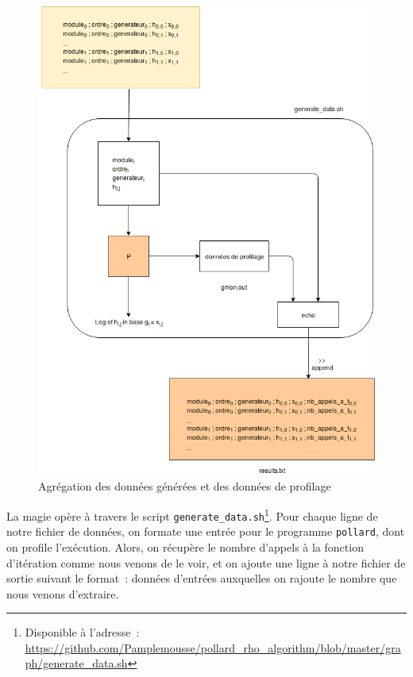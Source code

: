       \begin{figure}
        \center{}
        \includegraphics[scale=0.3]{images/generate_measurement_data.png}
        \caption{Agrégation des données générées et des données de profilage}
        \label{fig:generate_measurement_data}
      \end{figure}

      La magie opère à travers le script \lstinline{generate_data.sh}\footnote{Disponible à l'adresse~: \url{https://github.com/Pamplemousse/pollard_rho_algorithm/blob/master/graph/generate_data.sh}}.
      Pour chaque ligne de notre fichier de données, on formate une entrée pour le programme \lstinline{pollard}, dont on profile l'exécution.
      Alors, on récupère le nombre d'appels à la fonction d'itération comme nous venons de le voir, et on ajoute une ligne à notre fichier de sortie suivant le format~: données d'entrées auxquelles on rajoute le nombre que nous venons d'extraire.

